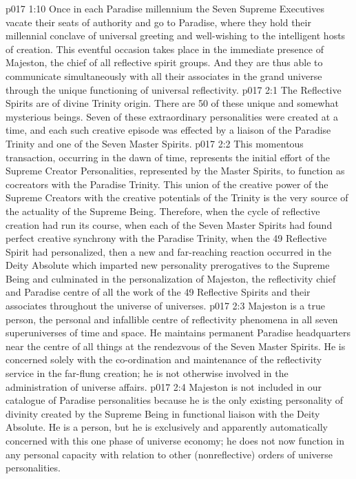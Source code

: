 \vs p017 1:10 Once in each Paradise millennium the Seven Supreme Executives vacate their seats of authority and go to Paradise, where they hold their millennial conclave of universal greeting and well\hyp{}wishing to the intelligent hosts of creation. This eventful occasion takes place in the immediate presence of Majeston, the chief of all reflective spirit groups. And they are thus able to communicate simultaneously with all their associates in the grand universe through the unique functioning of universal reflectivity.
\vs p017 2:1 The Reflective Spirits are of divine Trinity origin. There are 50 of these unique and somewhat mysterious beings. Seven of these extraordinary personalities were created at a time, and each such creative episode was effected by a liaison of the Paradise Trinity and one of the Seven Master Spirits.
\vs p017 2:2 This momentous transaction, occurring in the dawn of time, represents the initial effort of the Supreme Creator Personalities, represented by the Master Spirits, to function as cocreators with the Paradise Trinity. This union of the creative power of the Supreme Creators with the creative potentials of the Trinity is the very source of the actuality of the Supreme Being. Therefore, when the cycle of reflective creation had run its course, when each of the Seven Master Spirits had found perfect creative synchrony with the Paradise Trinity, when the 49 Reflective Spirit had personalized, then a new and far\hyp{}reaching reaction occurred in the Deity Absolute which imparted new personality prerogatives to the Supreme Being and culminated in the personalization of Majeston, the reflectivity chief and Paradise centre of all the work of the 49 Reflective Spirits and their associates throughout the universe of universes.
\vs p017 2:3 Majeston is a true person, the personal and infallible centre of reflectivity phenomena in all seven superuniverses of time and space. He maintains permanent Paradise headquarters near the centre of all things at the rendezvous of the Seven Master Spirits. He is concerned solely with the co\hyp{}ordination and maintenance of the reflectivity service in the far\hyp{}flung creation; he is not otherwise involved in the administration of universe affairs.
\vs p017 2:4 Majeston is not included in our catalogue of Paradise personalities because he is the only existing personality of divinity created by the Supreme Being in functional liaison with the Deity Absolute. He is a person, but he is exclusively and apparently automatically concerned with this one phase of universe economy; he does not now function in any personal capacity with relation to other (nonreflective) orders of universe personalities.
